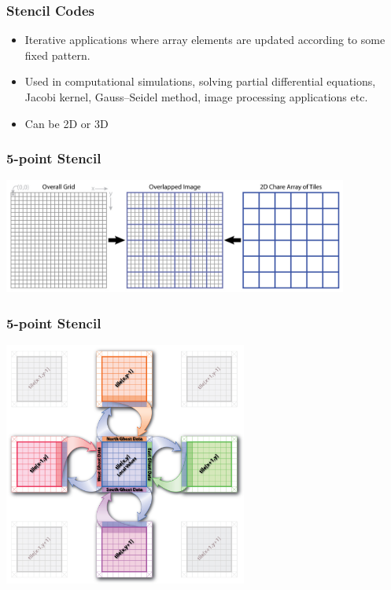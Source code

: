 %   

%   


\begin{frame}[fragile]
  \frametitle{Stencil Codes}
  \begin{center}
  \begin{itemize}
    \item Iterative applications where array elements are updated according to some fixed
    pattern.
    \item Used in computational simulations, solving partial differential equations, Jacobi kernel, Gauss–Seidel method, image processing applications etc.
    \item Can be 2D or 3D
  \end{itemize}
  \end{center}
\end{frame}

\begin{frame}[fragile]
  \frametitle{5-point Stencil}
   \begin{center} \includegraphics[width=0.85\textwidth]{figures/2DJacobi_Decomposition.jpg} \end{center}
\end{frame}

\begin{frame}[fragile]
  \frametitle{5-point Stencil}
   \begin{center} \includegraphics[width=0.6\textwidth]{figures/2DJacobi_NeighborComm.jpg} \end{center}
\end{frame}

